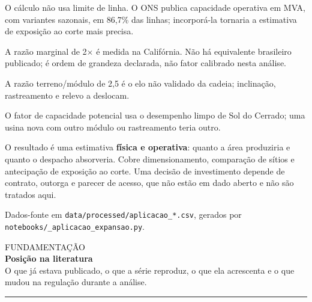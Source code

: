 \documentclass[10pt]{article}
\newcommand{\cab}[3]{%
  {\color{claro}\footnotesize\textsf{#1}}\\[-2pt]
  {\LARGE\textbf{#2}}\\[2pt]
  {\color{cinza}\small #3}\par\vspace{4pt}
  {\color{claro}\rule{\linewidth}{0.4pt}}\par\vspace{5pt}}
\newcommand{\bloco}[1]{\vspace{2pt}{\color{vermelho}\footnotesize\textbf{#1}}\par\vspace{-2pt}}
\newcommand{\ressalva}[1]{{\color{claro}\scriptsize #1}\par\vspace{1pt}}
\begin{document}
\vspace{5pt}{\color{claro}\rule{\linewidth}{0.4pt}}\par\vspace{4pt}
\begin{minipage}[t]{0.485\linewidth}\vspace{0pt}\small
\bloco{Limitações}
\ressalva{O cálculo não usa limite de linha. O ONS publica capacidade operativa em MVA, com variantes sazonais, em 86,7\% das linhas; incorporá-la tornaria a estimativa de exposição ao corte mais precisa.}
\ressalva{A razão marginal de 2$\times$ é medida na Califórnia. Não há equivalente brasileiro publicado; é ordem de grandeza declarada, não fator calibrado nesta análise.}
\ressalva{A razão terreno/módulo de 2,5 é o elo não validado da cadeia; inclinação, rastreamento e relevo a deslocam.}
\ressalva{O fator de capacidade potencial usa o desempenho limpo de Sol do Cerrado; uma usina nova com outro módulo ou rastreamento teria outro.}
\end{minipage}\hfill
\begin{minipage}[t]{0.485\linewidth}\vspace{0pt}\small
\bloco{Escopo}
O resultado é uma estimativa \textbf{física e operativa}: quanto a área produziria e
quanto o despacho absorveria. Cobre dimensionamento, comparação de sítios e antecipação
de exposição ao corte. Uma decisão de investimento depende de contrato, outorga e
parecer de acesso, que não estão em dado aberto e não são tratados aqui.
\par\vspace{3pt}
{\color{claro}\scriptsize Dados-fonte em \texttt{data/processed/aplicacao\_*.csv},
gerados por \texttt{notebooks/\_aplicacao\_expansao.py}.}
\end{minipage}
\clearpage

\cab{FUNDAMENTAÇÃO}{Posição na literatura}{O que já estava publicado, o que a série reproduz, o que ela acrescenta e o que mudou na regulação durante a análise.}
\end{document}

